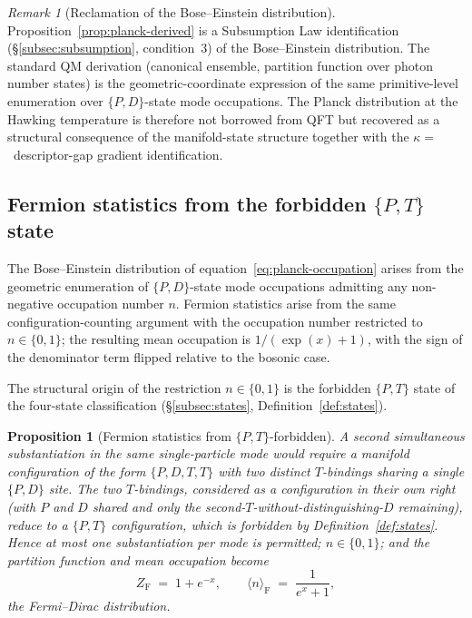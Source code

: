 \documentclass[11pt,a4paper]{article}
\newtheorem{proposition}[theorem]{Proposition}
\theoremstyle{definition}
\theoremstyle{remark}
\newtheorem{remark}[theorem]{Remark}
\begin{document}
\begin{remark}[Reclamation of the Bose--Einstein distribution]\label{rem:planck-reclaim}
Proposition~\ref{prop:planck-derived} is a Subsumption Law identification (\S\ref{subsec:subsumption}, condition~3) of the Bose--Einstein distribution. The standard QM derivation (canonical ensemble, partition function over photon number states) is the geometric-coordinate expression of the same primitive-level enumeration over $\{P,D\}$-state mode occupations. The Planck distribution at the Hawking temperature is therefore not borrowed from QFT but recovered as a structural consequence of the manifold-state structure together with the $\kappa = $~descriptor-gap gradient identification.
\end{remark}

\subsection{Fermion statistics from the forbidden $\{P,T\}$ state}\label{subsec:fermion-pauli}

The Bose--Einstein distribution of equation~\eqref{eq:planck-occupation} arises from the geometric enumeration of $\{P,D\}$-state mode occupations admitting any non-negative occupation number $n$. Fermion statistics arise from the same configuration-counting argument with the occupation number restricted to $n \in \{0,1\}$; the resulting mean occupation is $1/(\exp(x) + 1)$, with the sign of the denominator term flipped relative to the bosonic case.

The structural origin of the restriction $n \in \{0,1\}$ is the forbidden $\{P,T\}$ state of the four-state classification (\S\ref{subsec:states}, Definition~\ref{def:states}).

\begin{proposition}[Fermion statistics from $\{P,T\}$-forbidden]\label{prop:fermion-PT}
A second simultaneous substantiation in the same single-particle mode would require a manifold configuration of the form $\{P,D,T,T\}$ with two distinct $T$-bindings sharing a single $\{P,D\}$ site. The two $T$-bindings, considered as a configuration in their own right (with $P$ and $D$ shared and only the second-$T$-without-distinguishing-$D$ remaining), reduce to a $\{P,T\}$ configuration, which is forbidden by Definition~\ref{def:states}. Hence at most one substantiation per mode is permitted; $n \in \{0,1\}$; and the partition function and mean occupation become
\[
Z_{\mathrm{F}} \;=\; 1 + e^{-x}, \qquad \langle n\rangle_{\mathrm{F}} \;=\; \frac{1}{e^{x} + 1},
\]
the Fermi--Dirac distribution.
\end{proposition}
\end{document}
